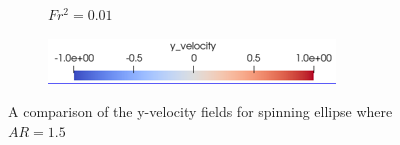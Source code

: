 \begin{figure}
\begin{subfigure}[b]{0.32\textwidth}
        \caption{$Fr^2 = 0.01$}
        \label{fig:ar1p5fr0p1}
    \end{subfigure}
    
    \begin{subfigure}[b]{0.32\textwidth}
        \centering
        \includegraphics[width=\textwidth]{images/spinning_ellipse/scale1.png}
        \caption*{}
    \end{subfigure}
    
    \caption{A comparison of the y-velocity fields for spinning ellipse where $AR = 1.5$}
    \label{fig:ar1p5 y-vel}
\end{figure}

